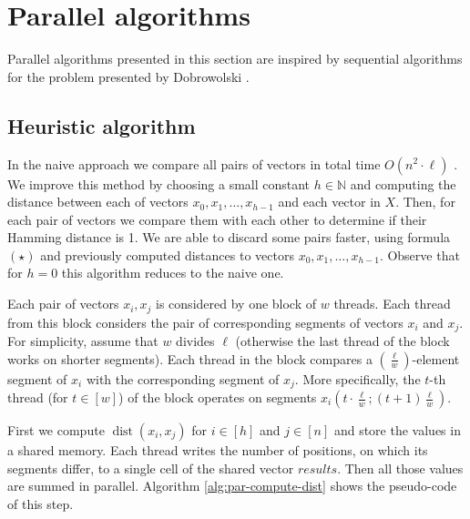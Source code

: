 \documentclass[a4paper]{article}
\DeclareMathOperator{\dist}{dist}
\begin{document}
\section{Parallel  algorithms} \label{sec:parallel}

Parallel algorithms presented in this section are inspired by sequential algorithms for the problem presented by Dobrowolski \cite{DBLP:conf/sii/Dobrowolski13}. 

\subsection{Heuristic algorithm}

In the naive approach we compare all pairs of vectors in total time $O(n^2 \cdot \ell)$ \cite{DBLP:conf/sii/Dobrowolski13}. We improve this method by choosing a small constant $h \in \mathbb{N}$ and computing the distance between each of vectors $x_0,x_1,\ldots,x_{h-1}$ and each vector in $X$.
Then, for each pair of vectors we compare them with each other to determine if their Hamming distance is 1. We are able to discard some pairs faster, using formula $(\star)$ and previously computed distances to vectors $x_0,x_1,\ldots,x_{h-1}$. Observe that for $h=0$ this algorithm reduces to the naive one.

Each pair of vectors $x_i,x_j$ is considered by one block of $w$ threads. Each thread from this block considers the pair of corresponding segments of vectors $x_i$ and $x_j$.
For simplicity, assume that $w$ divides $\ell$ (otherwise the last thread of the block works on shorter segments). Each thread in the block compares a $\left(\frac{\ell}{w}\right)$-element segment of $x_i$ with the corresponding segment of $x_j$. More specifically, the $t$-th thread (for $t \in [w]$) of the block operates on segments $x_i(t \cdot \frac{\ell}{w} ; (t+1) \frac{\ell}{w})$.

First we compute $\dist(x_i,x_j)$ for $i \in [h]$ and $j \in [n]$ and store the values in a shared memory.
Each thread writes the number of positions, on which its segments differ, to a single cell of the shared vector $results$.
Then all those values are summed in parallel.  
Algorithm \ref{alg:par-compute-dist} shows the pseudo-code of this step.
\end{document}
